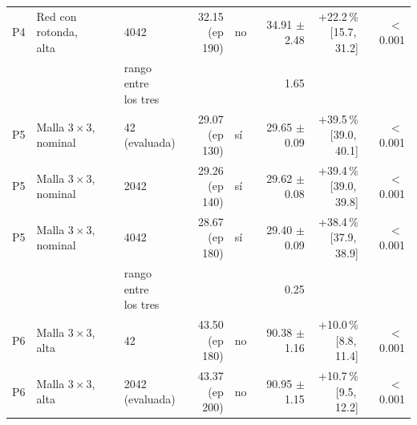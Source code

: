 \begin{table}[H]
\begin{tabular}{lllrlrrr}
P4 & \makecell[l]{Red con rotonda,\\{}alta} & 4042 & \makecell[r]{32.15\\{}(ep 190)} & no & \makecell[r]{34.91\\{}$\pm$ 2.48} & \makecell[r]{+22.2\,\%\\{}[15.7,\,31.2]} & $<$\,0.001 \\
 & & \makecell[l]{rango entre\\{}los tres} & & & 1.65 & & \\
P5 & \makecell[l]{Malla $3 \times 3$,\\{}nominal} & \makecell[l]{42\\{}(evaluada)} & \makecell[r]{29.07\\{}(ep 130)} & sí & \makecell[r]{29.65\\{}$\pm$ 0.09} & \makecell[r]{+39.5\,\%\\{}[39.0,\,40.1]} & $<$\,0.001 \\
P5 & \makecell[l]{Malla $3 \times 3$,\\{}nominal} & 2042 & \makecell[r]{29.26\\{}(ep 140)} & sí & \makecell[r]{29.62\\{}$\pm$ 0.08} & \makecell[r]{+39.4\,\%\\{}[39.0,\,39.8]} & $<$\,0.001 \\
P5 & \makecell[l]{Malla $3 \times 3$,\\{}nominal} & 4042 & \makecell[r]{28.67\\{}(ep 180)} & sí & \makecell[r]{29.40\\{}$\pm$ 0.09} & \makecell[r]{+38.4\,\%\\{}[37.9,\,38.9]} & $<$\,0.001 \\
 & & \makecell[l]{rango entre\\{}los tres} & & & 0.25 & & \\
P6 & \makecell[l]{Malla $3 \times 3$,\\{}alta} & 42 & \makecell[r]{43.50\\{}(ep 180)} & no & \makecell[r]{90.38\\{}$\pm$ 1.16} & \makecell[r]{+10.0\,\%\\{}[8.8,\,11.4]} & $<$\,0.001 \\
P6 & \makecell[l]{Malla $3 \times 3$,\\{}alta} & \makecell[l]{2042\\{}(evaluada)} & \makecell[r]{43.37\\{}(ep 200)} & no & \makecell[r]{90.95\\{}$\pm$ 1.15} & \makecell[r]{+10.7\,\%\\{}[9.5,\,12.2]} & $<$\,0.001 \\

\end{tabular}
\end{table}
